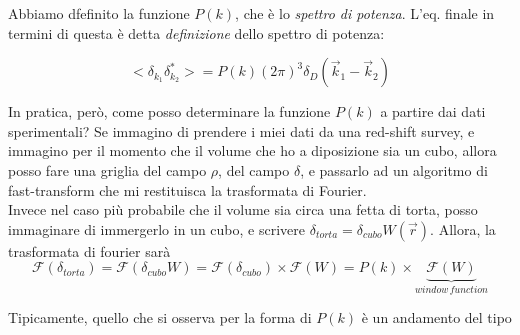 \documentclass{report}
\begin{document}
Abbiamo dfefinito la funzione $P(k)$, che è lo \emph{spettro di potenza}. L'eq. finale in termini di questa è detta \emph{definizione} dello spettro di potenza: 

\begin{tcolorbox}[colback=gray!15, colframe=black, boxrule=1pt]
\begin{equation}
    \label{definition_power_spectrum}
    <\delta_{k_1}\delta^{*}_{k_2} > = P(k)(2\pi)^3\delta_D(\vec{k}_1 - \vec{k}_2)
\end{equation}
\end{tcolorbox}

In pratica, però, come posso determinare la funzione $P(k)$ a partire dai dati sperimentali? Se immagino di prendere i miei dati da una red-shift survey, e immagino per il momento che il volume che ho a diposizione sia un cubo, allora posso fare una griglia del campo $\rho$, del campo $\delta$, e passarlo ad un algoritmo di fast-transform che mi restituisca la trasformata di Fourier. \\

Invece nel caso più probabile che il volume sia circa una fetta di torta, posso immaginare di immergerlo in un cubo, e scrivere $\delta_{torta} = \delta_{cubo}W(\vec{r})$. Allora, la trasformata di fourier sarà 
\begin{equation}
    \mathcal{F}(\delta_{torta}) = \mathcal{F}(\delta_{cubo}W) = \mathcal{F}(\delta_{cubo}) \times \mathcal{F}(W) = P(k) \times \underbrace{\mathcal{F}(W)}_{window \, function}  
\end{equation}

Tipicamente, quello che si osserva per la forma di $P(k)$ è un andamento del tipo 
\end{document}

